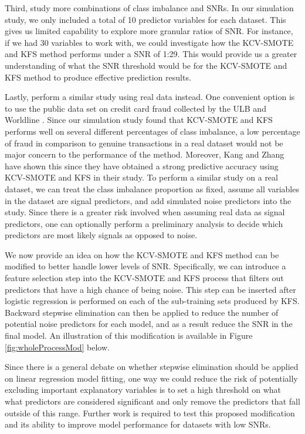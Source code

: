 \documentclass[a4paper, 12pt]{article}
\begin{document}
Third, study more combinations of class imbalance and SNRs. In our simulation study, we only included a total of 10 predictor variables for each dataset. This gives us limited capability to explore more granular ratios of SNR. For instance, if we had 30 variables to work with, we could investigate how the KCV-SMOTE and KFS method performs under a SNR of 1:29. This would provide us a greater understanding of what the SNR threshold would be for the KCV-SMOTE and KFS method to produce effective prediction results.

Lastly, perform a similar study using real data instead. One convenient option is to use the public data set on credit card fraud collected by the ULB and Worldline \cite{creditData}. Since our simulation study found that KCV-SMOTE and KFS performs well on several different percentages of class imbalance, a low percentage of fraud in comparison to genuine transactions in a real dataset would not be major concern to the performance of the method. Moreover, Kang and Zhang \cite{kcvSmoteStudy} have shown this since they have obtained a strong predictive accuracy using KCV-SMOTE and KFS in their study. To perform a similar study on a real dataset, we can treat the class imbalance proportion as fixed, assume all variables in the dataset are signal predictors, and add simulated noise predictors into the study. Since there is a greater risk involved when assuming real data as signal predictors, one can optionally perform a preliminary analysis to decide which predictors are most likely signals as opposed to noise.

We now provide an idea on how the KCV-SMOTE and KFS method can be modified to better handle lower levels of SNR. Specifically, we can introduce a feature selection step into the KCV-SMOTE and KFS process that filters out predictors that have a high chance of being noise. This step can be inserted after logistic regression is performed on each of the sub-training sets produced by KFS. Backward stepwise elimination can then be applied to reduce the number of potential noise predictors for each model, and as a result reduce the SNR in the final model. An illustration of this modification is available in Figure \ref{fig:wholeProcessMod} below.

Since there is a general debate on whether stepwise elimination should be applied on linear regression model fitting, one way we could reduce the risk of potentially excluding important explanatory variables is to set a high threshold on what what predictors are considered significant and only remove the predictors that fall outside of this range. Further work is required to test this proposed modification and its ability to improve model performance for datasets with low SNRs.
\end{document}
